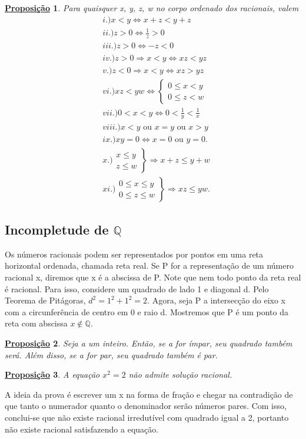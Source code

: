 \documentclass{article}
\newtheorem*{prop*}{\underline{Proposi\c c\~ao}}
\begin{document}
 \begin{prop*}
  Para quaisquer x, y, z, w no corpo ordenado dos racionais, valem 
 \begin{align*}
   &i.) x < y\Longleftrightarrow x + z < y + z \\
   &ii.) z > 0\Longleftrightarrow \frac{1}{z} > 0 \\
   &iii.) z > 0\Longleftrightarrow -z < 0 \\
   &iv.) z > 0\Rightarrow x < y\Longleftrightarrow xz < yz \\
   &v.) z < 0\Rightarrow x < y\Longleftrightarrow xz > yz \\
   &vi.) xz < yw\Longleftrightarrow \left\{\begin{array}{ll}
       0 \leq{x} < y \\
       0 \leq{z} < w
     \end{array}\right. \\
   &vii.) 0 < x < y\Longleftrightarrow 0 < \frac{1}{y} < \frac{1}{x}\\
   &viii.) x < y \text{ ou } x =y \text{ ou } x > y \\
   &ix.) xy = 0\Longleftrightarrow x = 0\text{ ou }y = 0. \\
   &x.) \left.\begin{array}{ll}
       x \leq{y} \\
       z \leq{w}
     \end{array}\right\}\Rightarrow x + z \leq{y + w}\\
   &xi.) \left.\begin{array}{ll}
       0 \leq{x} \leq{y}\\
       0 \leq{z} \leq{w}
   \end{array}\right\}\Rightarrow xz \leq{yw}.
 \end{align*}
 \end{prop*}
 \subsection{Incompletude de $\mathbb{Q}$}
  Os n\'umeros racionais podem ser representados por pontos em uma reta horizontal ordenada, chamada reta real. Se P for a representa\c c\~ao
de um n\'umero racional x, diremos que x \'e a abscissa de P. Note que nem todo ponto da reta real \'e racional. Para isso, considere
um quadrado de lado 1 e diagonal d. Pelo Teorema de Pit\'agoras, $d^{2} = 1^2 + 1^2 = 2.$ Agora, seja P a intersec\c c\~ao do eixo
x com a circunfer\^encia de centro em 0 e raio d. Mostremos que P \'e um ponto da reta com abscissa $x\not\in \mathbb{Q}.$
\begin{prop*}
  Seja a um inteiro. Ent\~ao, se a for \'impar, seu quadrado tamb\'em ser\'a. Al\'em disso, se a for par, seu quadrado tamb\'em \'e par.
\end{prop*}
\begin{prop*}
  A equa\c c\~ao $x^2 = 2$ n\~ao admite solu\c c\~ao racional.
\end{prop*}
  A ideia da prova \'e escrever um x na forma de fra\c c\~ao e chegar na contradi\c c\~ao de que tanto o numerador quanto o denominador
ser\~ao n\'umeros pares. Com isso, conclui-se que n\~ao existe racional irredut\'ivel com quadrado igual a 2, portanto n\~ao existe racional
satisfazendo a equa\c c\~ao. 
\end{document}

